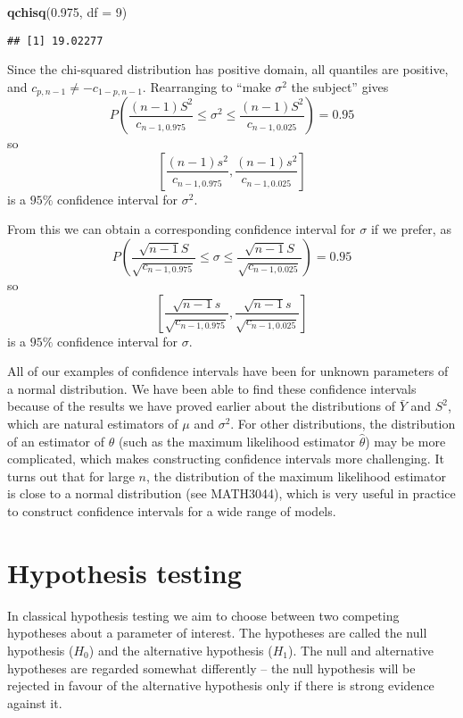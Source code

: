 \documentclass[]{book}
\newenvironment{Shaded}{\begin{snugshade}}{\end{snugshade}}
\newcommand{\KeywordTok}[1]{\textcolor[rgb]{0.13,0.29,0.53}{\textbf{#1}}}
\newcommand{\DataTypeTok}[1]{\textcolor[rgb]{0.13,0.29,0.53}{#1}}
\newcommand{\DecValTok}[1]{\textcolor[rgb]{0.00,0.00,0.81}{#1}}
\newcommand{\FloatTok}[1]{\textcolor[rgb]{0.00,0.00,0.81}{#1}}
\newcommand{\NormalTok}[1]{#1}
\theoremstyle{definition}
\theoremstyle{definition}
\theoremstyle{definition}
\theoremstyle{remark}
\begin{document}
\begin{Shaded}
\begin{Highlighting}[]
\KeywordTok{qchisq}\NormalTok{(}\FloatTok{0.975}\NormalTok{, }\DataTypeTok{df =} \DecValTok{9}\NormalTok{)}
\end{Highlighting}
\end{Shaded}

\begin{verbatim}
## [1] 19.02277
\end{verbatim}

Since the chi-squared distribution has positive domain, all quantiles
are positive, and \(c_{p, n-1} \not = - c_{1 - p, n-1}\). Rearranging to
``make \(\sigma^2\) the subject'' gives
\[P\left(\frac{(n-1) S^2}{c_{n-1, 0.975}} \leq \sigma^2
  \leq \frac{(n-1) S^2}{c_{n-1, 0.025}}\right) = 0.95\] so
\[\left[\frac{(n-1) s^2}{c_{n-1, 0.975}}, \frac{(n-1) s^2}{c_{n-1, 0.025}}\right]\]
is a \(95\%\) confidence interval for \(\sigma^2\).

From this we can obtain a corresponding confidence interval for
\(\sigma\) if we prefer, as
\[P\left(\frac{\sqrt{n-1} S}{\sqrt{c_{n-1, 0.975}}} \leq \sigma
  \leq \frac{\sqrt{n-1} S}{\sqrt{c_{n-1, 0.025}}}\right) = 0.95\] so
\[\left[\frac{\sqrt{n-1} s}{\sqrt{c_{n-1, 0.975}}},
  \frac{\sqrt{n-1} s}{\sqrt{c_{n-1, 0.025}}}\right]\] is a \(95\%\)
confidence interval for \(\sigma\).

All of our examples of confidence intervals have been for unknown
parameters of a normal distribution. We have been able to find these
confidence intervals because of the results we have proved earlier about
the distributions of \(\bar Y\) and \(S^2\), which are natural
estimators of \(\mu\) and \(\sigma^2\). For other distributions, the
distribution of an estimator of \(\theta\) (such as the maximum
likelihood estimator \(\hat \theta\)) may be more complicated, which
makes constructing confidence intervals more challenging. It turns out
that for large \(n\), the distribution of the maximum likelihood
estimator is close to a normal distribution (see MATH3044), which is
very useful in practice to construct confidence intervals for a wide
range of models.

\section{Hypothesis testing}\label{hypothesis-testing}

In classical hypothesis testing we aim to choose between two competing
hypotheses about a parameter of interest. The hypotheses are called the
null hypothesis (\(H_0\)) and the alternative hypothesis (\(H_1\)). The
null and alternative hypotheses are regarded somewhat differently -- the
null hypothesis will be rejected in favour of the alternative hypothesis
only if there is strong evidence against it.
\end{document}
